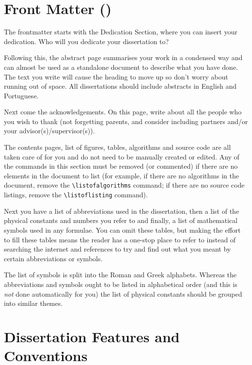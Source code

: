 \section{Front Matter ()}
\label{sec:frontmatter}

The frontmatter starts with the Dedication Section, where you can insert your dedication. Who will you dedicate your dissertation to?

Following this, the abstract page summarises your work in a condensed way and can almost be used as a standalone document to describe what you have done. The text you write will cause the heading to move up so don't worry about running out of space. All dissertations should include abstracts in English and Portuguese.

Next come the acknowledgements. On this page, write about all the people who you wish to thank (not forgetting parents, and consider including partners and/or your advisor(s)/supervisor(s)).

The contents pages, list of figures, tables, algorithms and source code are all taken care of for you and do not need to be manually created or edited. Any of the commands in this section must be removed (or commented) if there are no elements in the document to list (for example, if there are no algorithms in the document, remove the \verb|\listofalgorithms| command; if there are no source code listings, remove the \verb|\listoflisting| command).

Next you have a list of abbreviations used in the dissertation, then a list of the physical constants and numbers you refer to and finally, a list of mathematical symbols used in any formulae. You can omit these tables, but making the effort to fill these tables means the reader has a one-stop place to refer to instead of searching the internet and references to try and find out what you meant by certain abbreviations or symbols.

The list of symbols is split into the Roman and Greek alphabets. Whereas the abbreviations and symbols ought to be listed in alphabetical order (and this is \emph{not} done automatically for you) the list of physical constants should be grouped into similar themes.


\section{Dissertation Features and Conventions}\label{ThesisConventions}

